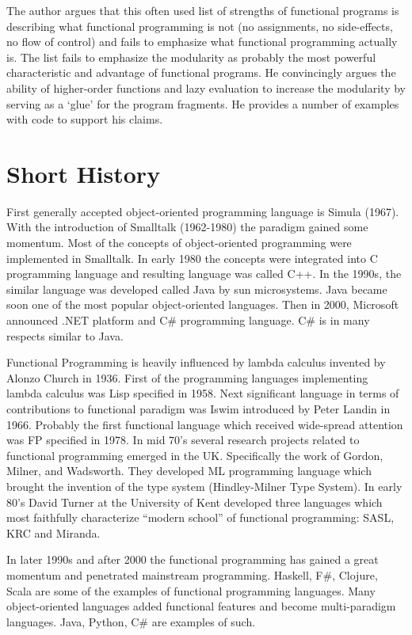 \documentclass[12pt,twoside,a4paper]{report}
\begin{document}
The author argues that this often used list of strengths of functional programs is describing what functional programming is not (no assignments, no side-effects, no flow of control) and fails to emphasize what functional programming actually is. The list fails to emphasize the modularity as probably the most
powerful characteristic and advantage of functional programs. He convincingly argues the ability of higher-order functions and lazy evaluation to increase the modularity by serving as a ‘glue’ for the program fragments. He provides a number of examples with code to support his claims.

\section{Short History}
First generally accepted object-oriented programming language is Simula (1967). With the introduction of Smalltalk (1962-1980) the paradigm gained some momentum. Most of the concepts of object-oriented programming were implemented in Smalltalk. In early 1980 the concepts were integrated into C programming language and resulting language was called C++. In the 1990s, the similar language was developed called Java by sun microsystems. Java became soon one of the most popular object-oriented languages. Then in 2000, Microsoft announced .NET platform and C\# programming language. C\# is in many respects similar to Java. \cite{13}

Functional Programming is heavily influenced by lambda calculus invented by Alonzo Church in 1936. First of the programming languages implementing lambda calculus was Lisp specified in 1958. Next significant language in terms of contributions to functional paradigm was Iswim introduced by Peter Landin in 1966. Probably the first functional language which received wide-spread attention was FP specified in 1978. In mid 70’s several research projects related to functional programming emerged in the UK. Specifically the work of Gordon, Milner, and Wadsworth. They developed ML programming language which brought the invention of the type system (Hindley-Milner Type System). In early 80’s David Turner at the University of Kent developed three languages which most faithfully characterize “modern school” of functional programming: SASL, KRC and Miranda. \cite{12}

In later 1990s and after 2000 the functional programming has gained a great momentum and penetrated mainstream programming. Haskell, F\#, Clojure, Scala are some of the examples of functional
programming languages. Many object-oriented languages added functional features and become multi-paradigm languages. Java, Python, C\# are examples of such.
\end{document}
